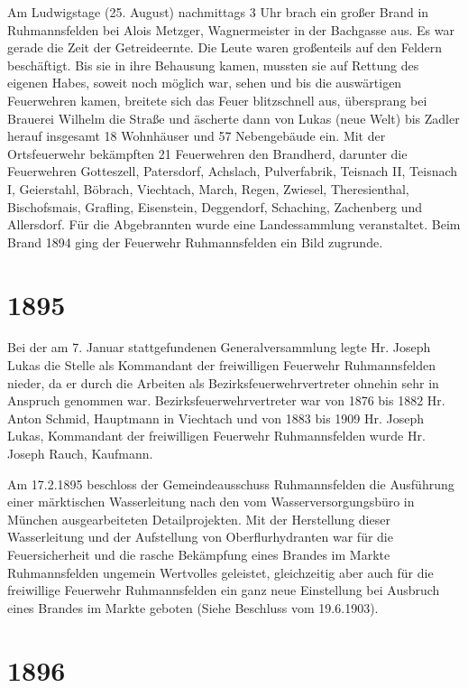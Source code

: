 \documentclass[12pt,a4paper]{book}
\begin{document}
Am Ludwigstage (25. August) nachmittags 3 Uhr brach ein großer Brand in
Ruhmannsfelden bei Alois Metzger, Wagnermeister in der Bachgasse aus. Es war
gerade die Zeit der Getreideernte. Die Leute waren großenteils auf den Feldern
beschäftigt. Bis sie in ihre Behausung kamen, mussten sie auf Rettung des
eigenen Habes, soweit noch möglich war, sehen und bis die auswärtigen
Feuerwehren kamen, breitete sich das Feuer blitzschnell aus, übersprang bei
Brauerei Wilhelm die Straße und äscherte dann von Lukas (neue Welt) bis Zadler
herauf insgesamt 18 Wohnhäuser und 57 Nebengebäude ein. Mit der Ortsfeuerwehr
bekämpften 21 Feuerwehren den Brandherd, darunter die Feuerwehren Gotteszell,
Patersdorf, Achslach, Pulverfabrik, Teisnach II, Teisnach I, Geierstahl,
Böbrach, Viechtach, March, Regen, Zwiesel, Theresienthal, Bischofsmais,
Grafling, Eisenstein, Deggendorf, Schaching, Zachenberg und Allersdorf. Für die
Abgebrannten wurde eine Landessammlung veranstaltet. Beim Brand 1894 ging der
Feuerwehr Ruhmannsfelden ein Bild zugrunde.

\section*{1895}

Bei der am 7. Januar stattgefundenen Generalversammlung legte Hr. Joseph
Lukas die Stelle als Kommandant der freiwilligen Feuerwehr Ruhmannsfelden
nieder, da er durch die Arbeiten als Bezirksfeuerwehrvertreter ohnehin sehr in
Anspruch genommen war. Bezirksfeuerwehrvertreter war von 1876 bis 1882 Hr. Anton
Schmid, Hauptmann in Viechtach und von 1883 bis 1909 Hr. Joseph Lukas,
Kommandant der freiwilligen Feuerwehr Ruhmannsfelden wurde Hr. Joseph Rauch,
Kaufmann.

Am 17.2.1895 beschloss der Gemeindeausschuss Ruhmannsfelden die Ausführung einer
märktischen Wasserleitung nach den vom Wasserversorgungsbüro in München
ausgearbeiteten Detailprojekten. Mit der Herstellung dieser Wasserleitung und
der Aufstellung von Oberflurhydranten war für die Feuersicherheit und die rasche
Bekämpfung eines Brandes im Markte Ruhmannsfelden ungemein Wertvolles geleistet,
gleichzeitig aber auch für die freiwillige Feuerwehr Ruhmannsfelden ein ganz
neue Einstellung bei Ausbruch eines Brandes im Markte geboten (Siehe Beschluss
vom 19.6.1903).

\section*{1896}
\end{document}
